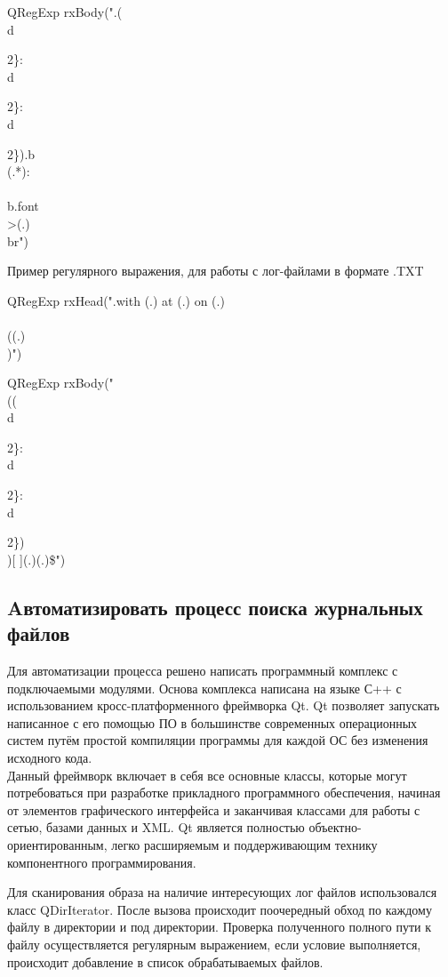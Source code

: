 QRegExp rxBody(".\*(\\d{2\}:\\d\\{2\}:\\d\\{2\}).\*b\\\>(.*):\\\<\\\/b.\*font\\>(.\*)\\\<br")


Пример регулярного выражения, для работы с лог-файлами в формате .TXT

QRegExp rxHead(".\*with (.\*) at (.\*) on (.\*)\\\/ \\((.\*)\\)")

QRegExp rxBody("\\((\\d\\{2\}:\\d\\{2\}:\\d\\{2\})\\)[ ]\*(.\*)\:(.\*)\$")


\subsection{Aвтоматизировать процесс поиска журнальных файлов}

Для автоматизации процесса решено написать программный комплекс с подключаемыми модулями. Основа комплекса написана на языке С++ с использованием кросс-платформенного фреймворка Qt.
Qt позволяет запускать написанное с его помощью ПО в большинстве современных операционных систем путём простой компиляции программы для каждой ОС без изменения исходного кода.\\
Данный фреймворк включает в себя все основные классы, которые могут потребоваться при разработке прикладного программного обеспечения, начиная от элементов графического интерфейса и заканчивая классами для работы с сетью, базами данных и XML. Qt является полностью объектно-ориентированным, легко расширяемым и поддерживающим технику компонентного программирования.

Для сканирования образа на наличие интересующих лог файлов использовался класс QDirIterator. После вызова происходит поочередный обход по каждому файлу в директории и под директории. Проверка полученного полного пути к файлу осуществляется регулярным выражением, если условие выполняется, происходит добавление в список обрабатываемых файлов. 


}}}}}}
